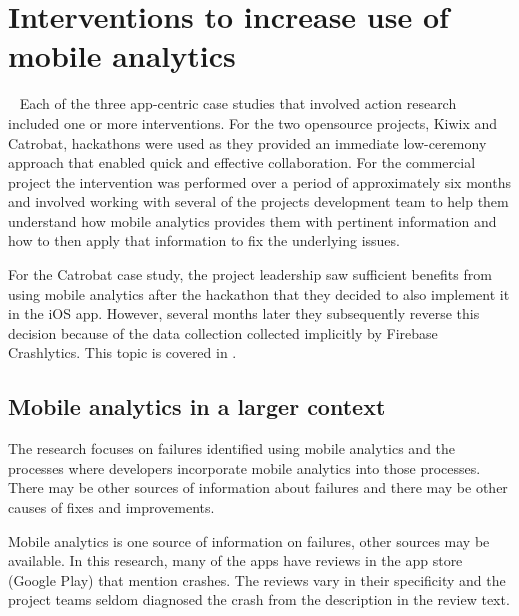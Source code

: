 \section{Interventions to increase use of mobile analytics}~\label{aiu-interventions-theme}
Each of the three app-centric case studies that involved action research included one or more interventions. For the two opensource projects, Kiwix and Catrobat, hackathons were used as they provided an immediate low-ceremony approach that enabled quick and effective collaboration. For the commercial project the intervention was performed over a period of approximately six months and involved working with several of the projects development team to help them understand how mobile analytics provides them with pertinent information and how to then apply that information to fix the underlying issues. 

For the Catrobat case study, the project leadership saw sufficient benefits from using mobile analytics after the hackathon that they decided to also implement it in the iOS app. However, several months later they subsequently reverse this decision because of the data collection collected implicitly by Firebase Crashlytics. This topic is covered in .


\subsection{Mobile analytics in a larger context}
The research focuses on failures identified using mobile analytics and the processes where developers incorporate mobile analytics into those processes. There may be other sources of information about failures and there may be other causes of fixes and improvements.

Mobile analytics is one source of information on failures, other sources may be available. In this research, many of the apps have reviews in the app store (Google Play) that mention crashes. The reviews vary in their specificity and the project teams seldom diagnosed the crash from the description in the review text.   

